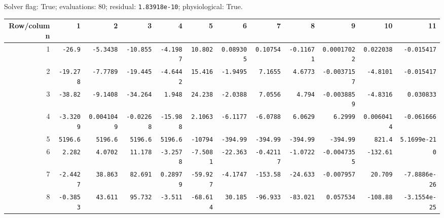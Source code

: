 \begin{landscape}
{Solver flag: True; evaluations: 80; residual: \texttt{1.83918e-10}; physiological: True.\par}

\begingroup\scriptsize\setlength{\tabcolsep}{3pt}\centering
\begin{tabular}{rrrrrrrrrrrr}\toprule

Row/column & 1 & 2 & 3 & 4 & 5 & 6 & 7 & 8 & 9 & 10 & 11 \\ \midrule

1 & \texttt{-26.9} & \texttt{-5.3438} & \texttt{-10.855} & \texttt{-4.1987} & \texttt{10.802} & \texttt{0.089305} & \texttt{0.10754} & \texttt{-0.11671} & \texttt{0.00017022} & \texttt{0.022038} & \texttt{-0.015417} \\

2 & \texttt{-19.278} & \texttt{-7.7789} & \texttt{-19.445} & \texttt{-4.6442} & \texttt{15.416} & \texttt{-1.9495} & \texttt{7.1655} & \texttt{4.6773} & \texttt{-0.0037157} & \texttt{-4.8101} & \texttt{-0.015417} \\

3 & \texttt{-38.82} & \texttt{-9.1408} & \texttt{-34.264} & \texttt{1.948} & \texttt{24.238} & \texttt{-2.0388} & \texttt{7.0556} & \texttt{4.794} & \texttt{-0.0038859} & \texttt{-4.8316} & \texttt{0.030833} \\

4 & \texttt{-3.3209} & \texttt{0.0041049} & \texttt{-0.02268} & \texttt{-15.988} & \texttt{2.1063} & \texttt{-6.1177} & \texttt{-6.0788} & \texttt{6.0629} & \texttt{6.2999} & \texttt{0.0060414} & \texttt{-0.061666} \\

5 & \texttt{5196.6} & \texttt{5196.6} & \texttt{5196.6} & \texttt{5196.6} & \texttt{-10794} & \texttt{-394.99} & \texttt{-394.99} & \texttt{-394.99} & \texttt{-394.99} & \texttt{821.4} & \texttt{5.1699e-21} \\

6 & \texttt{2.282} & \texttt{4.0702} & \texttt{11.178} & \texttt{-3.2578} & \texttt{-7.5081} & \texttt{-22.363} & \texttt{-0.42117} & \texttt{-1.0722} & \texttt{-0.0047355} & \texttt{-132.61} & \texttt{0} \\

7 & \texttt{-2.4427} & \texttt{38.863} & \texttt{82.691} & \texttt{0.28979} & \texttt{-59.927} & \texttt{-4.1747} & \texttt{-153.58} & \texttt{-24.633} & \texttt{-0.007957} & \texttt{20.709} & \texttt{-7.8886e-26} \\

8 & \texttt{-0.3853} & \texttt{43.611} & \texttt{95.732} & \texttt{-3.511} & \texttt{-68.614} & \texttt{30.185} & \texttt{-96.933} & \texttt{-83.021} & \texttt{0.057534} & \texttt{-108.88} & \texttt{-3.1554e-25} \\


\end{tabular}
\end{landscape}
